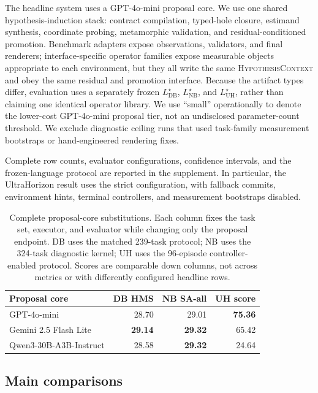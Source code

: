\documentclass[letterpaper]{article}
\newcommand{\tblhdr}{\rowcolor{headerrow}}
\newcommand{\gptmini}{GPT-4o-mini\xspace}
\begin{document}
The headline system uses a \gptmini proposal core. We use one shared
hypothesis-induction stack: contract compilation, typed-hole closure,
estimand synthesis, coordinate probing, metamorphic validation, and
residual-conditioned promotion. Benchmark adapters expose observations,
validators, and final renderers; interface-specific operator families expose
measurable objects appropriate to each environment, but they all write the same
\textsc{HypothesisContext} and obey the same residual and promotion interface.
Because the artifact types differ, evaluation uses a separately frozen
$L^\star_{\mathrm{DB}}$, $L^\star_{\mathrm{NB}}$, and
$L^\star_{\mathrm{UH}}$, rather than claiming one identical operator library.
We use ``small'' operationally to denote the lower-cost \gptmini proposal tier,
not an undisclosed parameter-count threshold.
We exclude diagnostic ceiling runs that used task-family measurement
bootstraps or hand-engineered rendering fixes.

Complete row counts, evaluator configurations, confidence intervals, and the
frozen-language protocol are reported in the supplement. In particular, the
UltraHorizon result uses the strict configuration, with fallback commits,
environment hints, terminal controllers, and measurement bootstraps disabled.

\begin{table}[t]
\centering
\small
\begin{tabularx}{\columnwidth}{|Y|r|r|r|}
\hline
\tblhdr
Proposal core & DB HMS & NB SA-all & UH score \\
\hline
{}
GPT-4o-mini & 28.70 & 29.01 & \textbf{75.36} \\
\hline
{}
Gemini 2.5 Flash Lite & \textbf{29.14} & \textbf{29.32} & 65.42 \\
\hline
{}
Qwen3-30B-A3B-Instruct & 28.58 & \textbf{29.32} & 24.64 \\
\hline
\end{tabularx}
\caption{Complete proposal-core substitutions. Each column fixes the task set,
executor, and evaluator while changing only the proposal endpoint. DB uses the
matched 239-task protocol; NB uses the 324-task diagnostic kernel; UH uses the
96-episode controller-enabled protocol. Scores are comparable down columns,
not across metrics or with differently configured headline rows.}
\label{tab:core_substitution}
\end{table}

\subsection{Main comparisons}
\end{document}
